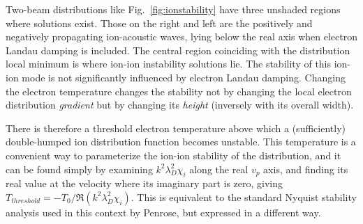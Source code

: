 \documentclass[pre]{revtex4-2}
\begin{document}
Two-beam distributions like Fig.\ \ref{fig:ionstability} have three
unshaded regions where solutions exist. Those on the right and left
are the positively and negatively propagating ion-acoustic waves,
lying below the real axis when electron Landau damping is
included. The central region coinciding with the distribution local
minimum is where ion-ion instability solutions lie.
The stability of this ion-ion
mode is not significantly influenced by electron Landau damping. Changing
the electron temperature changes the stability not by changing the
local electron distribution \emph{gradient} but by changing its
\emph{height} (inversely with its overall width).  

There is therefore a threshold electron temperature above which a
(sufficiently) double-humped ion distribution function becomes
unstable. This temperature is a convenient way to parameterize the
ion-ion stability of the distribution, and it can be found simply by
examining $k^2\lambda_D^2\chi_i$ along the real $v_p$ axis, and
finding its real value at the velocity where its imaginary part is
zero, giving $T_{threshold}=-T_0/\Re(k^2\lambda_D^2\chi_i)$. This is
equivalent to the standard Nyquist stability analysis used in this
context by Penrose\cite{Penrose1960}, but expressed in a different way.
\end{document}
